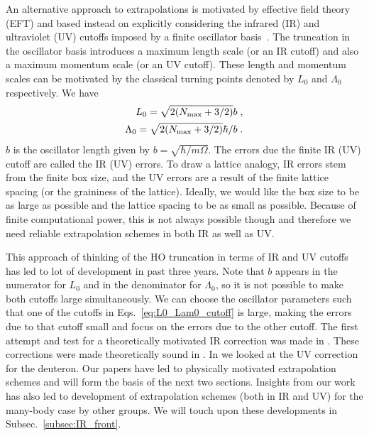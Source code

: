 	An alternative approach to extrapolations is motivated by effective field
	theory (EFT) and based instead on explicitly considering the infrared (IR)
	and ultraviolet (UV) cutoffs imposed by a finite oscillator
	basis~\cite{Coon:2012ab}.  The truncation in the oscillator basis introduces
	a maximum length scale (or an IR cutoff) and also a maximum momentum scale
	(or an UV cutoff).  These length and momentum scales can be motivated by
	the classical turning points denoted by $L_0$ and $\Lambda_0$ respectively.
	We have
	\begin{align}
	L_0 = \sqrt{2 ({N_{\mathrm{max}}} + 3/2)} b \;,  \nonumber\\
	\Lambda_0 = \sqrt{2 ({N_{\mathrm{max}}} + 3/2)} \hbar/b \;.
	\label{eq:L0_Lam0_cutoff}
	\end{align}
	$b$ is the oscillator length given by
	$\displaystyle b = \sqrt{\hbar/ m \Omega}$.
	The errors due the finite IR (UV) cutoff are called the IR (UV) errors.
	To draw a lattice analogy, IR errors stem from the finite box size,
	and the UV errors are a result of the finite lattice spacing (or the
	graininess of the lattice).  Ideally, we would like the box size to be as
	large as possible and the lattice spacing to be as small as possible.
	Because of finite computational power, this is not always possible though
	and therefore we need reliable extrapolation schemes in both IR as well as UV.

	This approach of thinking of the HO truncation in terms of IR and UV cutoffs
	has led to lot of development in past three years.
	Note that $b$ appears in the numerator for $L_0$ and in the denominator
	for $\Lambda_0$, so it is not possible to make both cutoffs large
	simultaneously.  
	We can choose the oscillator parameters such that one of the cutoffs in
	Eqs.~\eqref{eq:L0_Lam0_cutoff} is large, making the errors due to that cutoff
	small and focus on the errors due to the other cutoff.
	The first attempt and
	test for a theoretically motivated IR correction was made in
	\cite{Furnstahl2012}.  These corrections were made theoretically sound
	in \cite{More:2013rma, Furnstahl:2013vda}.  In \cite{Konig:2014hma} we looked
	at the UV correction for the deuteron.
	Our papers \cite{More:2013rma, Furnstahl:2013vda, Konig:2014hma} have led to
	physically motivated extrapolation schemes and will form the basis of the next
	two sections.  Insights from our work has also led to development of
	extrapolation schemes (both in IR and UV) for the many-body case by other
	groups.  We will touch upon these developments in
	Subsec.~\ref{subsec:IR_front}.

